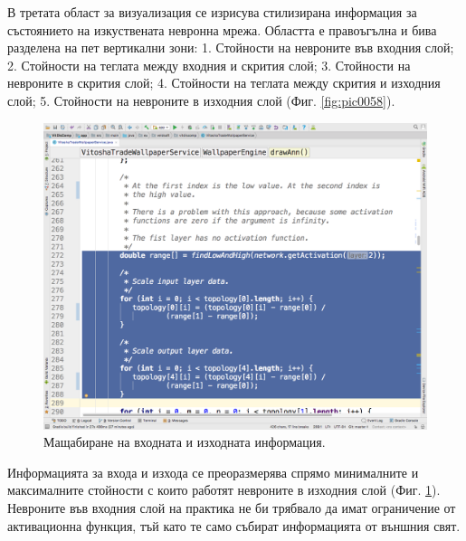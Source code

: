\documentclass[book,14pt,oneside,openany]{memoir}
\begin{document}
В третата област за визуализация се изрисува стилизирана информация за състоянието на изкуствената невронна мрежа. Областта е правоъгълна и бива разделена на пет вертикални зони: 1. Стойности на невроните във входния слой; 2. Стойности на теглата между входния и скрития слой; 3. Стойности на невроните в скрития слой; 4. Стойности на теглата между скрития и изходния слой; 5. Стойности на невроните в изходния слой (Фиг. \ref{fig:pic0058}).

\begin{figure}[h]
  \centering
  \includegraphics[height=0.45\pdfpageheight]{pic0059}
  \caption{Мащабиране на входната и изходната информация.}
\label{fig:pic0059}
\end{figure}
\FloatBarrier

Информацията за входа и изхода се преоразмерява спрямо минималните и максималните стойности с които работят невроните в изходния слой (Фиг. \ref{fig:pic0059}). Невроните във входния слой на практика не би трябвало да имат ограничение от активационна функция, тъй като те само събират информацията от външния свят. 
\end{document}
